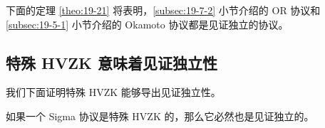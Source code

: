 \begin{example}
下面的定理 \ref{theo:19-21} 将表明，\ref{subsec:19-7-2} 小节介绍的 OR 协议和 \ref{subsec:19-5-1} 小节介绍的 Okamoto 协议都是见证独立的协议。
\end{example}

\subsection{特殊 HVZK 意味着见证独立性}

我们下面证明特殊 HVZK 能够导出见证独立性。

\begin{theorem}\label{theo:19-21}
如果一个 Sigma 协议是特殊 HVZK 的，那么它必然也是见证独立的。
\end{theorem}

